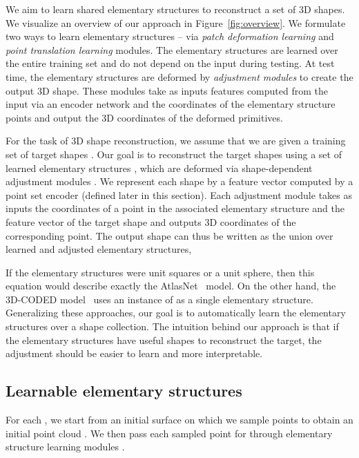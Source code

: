 \documentclass{article}
\begin{document}
We aim to learn shared elementary structures to reconstruct a set of 3D shapes.  We visualize an overview of our approach in Figure~\ref{fig:overview}. We formulate two ways to learn elementary structures -- via  \textit{patch deformation learning } and \textit{point translation learning } modules. The elementary structures are learned over the entire training set and do not depend on the input during testing. At test time, the elementary structures are deformed by \textit{adjustment modules} to create the output 3D shape. These modules take as inputs features computed from the input via an encoder network and the coordinates of the elementary structure points and output the 3D coordinates of the deformed primitives.

For the task of 3D shape reconstruction, we assume that we are given a training set  of target shapes .
Our goal is to reconstruct the target shapes using a set of  learned elementary structures , which are deformed via shape-dependent adjustment modules . We represent each shape by a feature vector  computed by a point set encoder  (defined later in this section).
Each adjustment module  takes as inputs the coordinates of a point in the associated elementary structure  and the feature vector of the target shape   and outputs 3D coordinates of the corresponding point. The output shape  can thus be written as the union over learned and adjusted elementary structures,



 If the elementary structures were unit squares or a unit sphere, then this equation would describe exactly the AtlasNet~\cite{groueix2018} model. On the other hand, the 3D-CODED model~\cite{groueix2018b} uses an instance of  as a single elementary structure.
Generalizing these approaches, our goal is to automatically learn the elementary structures  over a shape collection.
The intuition behind our approach is that if the elementary structures  have useful shapes to reconstruct the target, the adjustment  should be easier to learn and more interpretable.


\vspace{-1em}
\subsection{Learnable elementary structures}

 For each , we start from an initial surface  on which we sample  points to obtain an initial point cloud .
 We then pass each sampled point  for  through elementary structure learning modules .
\end{document}
